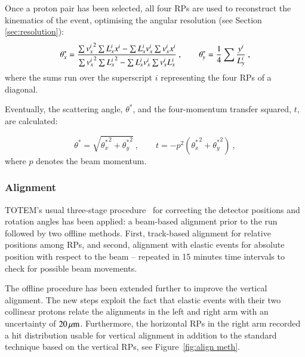 Once a proton pair has been selected, all four RPs are used to reconstruct the kinematics of the event, optimising the angular resolution (see Section \ref{sec:resolution}):
\begin{equation}
\label{eq:kin 2a}
		\theta_x^* = {
				\sum {v_x^i}^2 \sum L_x^i x^i - \sum L_x^i v_x^i \sum v_x^i x^i
				\over
				\sum {v_x^i}^2 \sum {L_x^i}^2 - \sum L_x^i v_x^i \sum v_x^i L_x^i
			}\ ,\qquad
		\theta_y^* = {1\over 4} \sum {y^i\over L_y^i}\ ,
\end{equation}
where the sums run over the superscript $i$ representing the four RPs of a diagonal.

Eventually, the scattering angle, $\theta^*$, and the four-momentum transfer squared, $t$, are calculated:

\begin{equation}
\label{eq:th t}
\theta^* = \sqrt{{\theta_x^*}^2 + {\theta_y^*}^2}\ ,\qquad t = - p^2 ({\theta_x^*}^2 + {\theta_y^*}^2)\ ,
\end{equation}
where $p$ denotes the beam momentum.



\subsubsection{Alignment}
\label{sec:alignment}

TOTEM's usual three-stage procedure~\cite{totem-ijmp} for correcting the detector positions and rotation angles  
has been applied: a beam-based alignment prior to the run followed by two offline methods. First, track-based alignment for relative positions among RPs, and second, alignment with elastic events for absolute position with respect to the beam -- repeated in 15 minutes time intervals to check for possible beam movements.

The offline procedure has been extended further to improve the vertical alignment. The new steps exploit the fact that elastic events with their two collinear protons relate the alignments in the left and right arm with an uncertainty of $20\,{\rm \mu m}$. Furthermore, the horizontal RPs in the right arm recorded a hit distribution usable for vertical alignment in addition to the standard technique based on the vertical RPs, see Figure~\ref{fig:align meth}.

